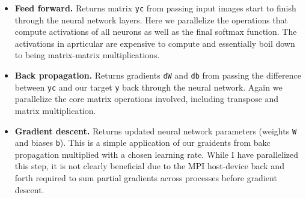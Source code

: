 \documentclass[12pt,letterpaper,twoside]{article}
\begin{document}
\begin{itemize}
    \item \textbf{Feed forward.} Returns matrix \texttt{yc} from passing input images
    start to finish through the neural network layers. Here we parallelize the operations
    that compute activations of all neurons as well as the final softmax function. The 
    activations in aprticular are expensive to compute and essentially boil down to being 
    matrix-matrix multiplications. 

    \item \textbf{Back propagation.} Returns gradients \texttt{dW} and \texttt{db} from 
    passing the difference between \texttt{yc} and our target \texttt{y} back through the 
    neural network. Again we parallelize the core matrix operations involved, including
    transpose and matrix multiplication.

    \item \textbf{Gradient descent.} Returns updated neural network parameters (weights 
    \texttt{W} and biases \texttt{b}). This is a simple application of our graidents from 
    bakc propagation multiplied with a chosen learning rate. While I have parallelized this
    step, it is not clearly beneficial due to the MPI host-device back and forth required 
    to sum partial gradients across processes before gradient descent. 

\end{itemize}
\end{document}
